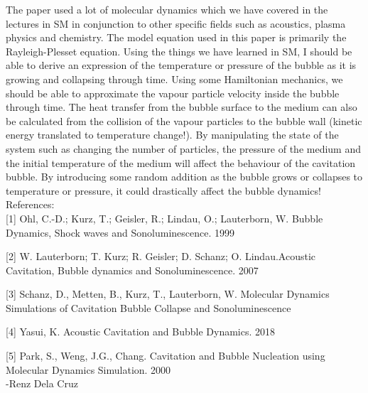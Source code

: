 \documentclass[12pt, letterpaper, oneside, article]{memoir}
\begin{document}
The paper used a lot of molecular dynamics which we have covered in the lectures in SM in conjunction to other specific fields such as acoustics, plasma physics and chemistry. The model equation used in this paper is primarily the Rayleigh-Plesset equation. Using the things we have learned in SM, I should be able to derive an expression of the temperature or pressure of the bubble as it is growing and collapsing through time. Using some Hamiltonian mechanics, we should be able to approximate the vapour particle velocity inside the bubble through time. The heat transfer from the bubble surface to the medium can also be calculated from the collision of the vapour particles to the bubble wall (kinetic energy translated to temperature change!). By manipulating the state of the system such as changing the number of particles, the pressure of the medium and the initial temperature of the medium will affect the behaviour of the cavitation bubble. By introducing some random addition as the bubble grows or collapses to temperature or pressure, it could drastically affect the bubble dynamics!\\


References:\\

[1] Ohl, C.-D.; Kurz, T.; Geisler, R.; Lindau, O.; Lauterborn, W. Bubble Dynamics, Shock waves and Sonoluminescence. 1999

[2] W. Lauterborn; T. Kurz; R. Geisler; D. Schanz; O. Lindau.Acoustic Cavitation, Bubble dynamics and Sonoluminescence. 2007

[3] Schanz, D., Metten, B., Kurz, T., Lauterborn, W. Molecular Dynamics Simulations of Cavitation Bubble Collapse and Sonoluminescence

[4] Yasui, K. Acoustic Cavitation and Bubble Dynamics. 2018

[5] Park, S., Weng, J.G., Chang. Cavitation and Bubble Nucleation using Molecular Dynamics Simulation. 2000\\

-Renz Dela Cruz
\end{document}
